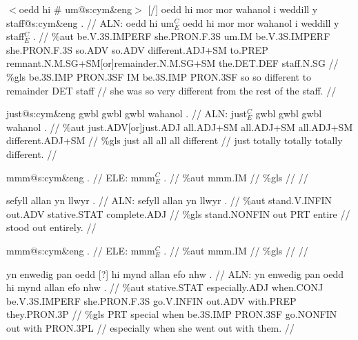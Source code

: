 \documentclass[a4paper,10pt]{article}
\begin{document}
\ex
\begingl[lingstyle=gergl]
\glchat $<$oedd hi \# um@s:cym\&eng$>$ [/] oedd hi mor mor wahanol i weddill y staff@s:cym\&eng . //
\glsurface ALN:  oedd hi um$^{C}_{E}$ oedd hi mor mor wahanol i weddill y staff$^{C}_{E}$ .  //
\glauto \%aut  be{\scriptsize .V.3S.IMPERF} she{\scriptsize .PRON.F.3S} um{\scriptsize .IM} be{\scriptsize .V.3S.IMPERF} she{\scriptsize .PRON.F.3S} so{\scriptsize .ADV} so{\scriptsize .ADV} different{\scriptsize .ADJ+SM} to{\scriptsize .PREP} remnant{\scriptsize .N.M.SG+SM[or]remainder.N.M.SG+SM} the{\scriptsize .DET.DEF} staff{\scriptsize .N.SG}   //
\glmanual \%gls  be{\scriptsize .3S.IMP} PRON{\scriptsize .3SF} IM be{\scriptsize .3S.IMP} PRON{\scriptsize .3SF} so so different to remainder DET staff   //
\gleng she was so very different from the rest of the staff. //
\endgl
\xe

\ex
\begingl[lingstyle=gergl]
\glchat just@s:cym\&eng gwbl gwbl gwbl wahanol . //
\glsurface ALN:  just$^{C}_{E}$ gwbl gwbl gwbl wahanol .  //
\glauto \%aut  just{\scriptsize .ADV[or]just.ADJ} all{\scriptsize .ADJ+SM} all{\scriptsize .ADJ+SM} all{\scriptsize .ADJ+SM} different{\scriptsize .ADJ+SM}   //
\glmanual \%gls  just all all all different   //
\gleng just totally totally totally different. //
\endgl
\xe

\ex
\begingl[lingstyle=gergl]
\glchat mmm@s:cym\&eng . //
\glsurface ELE:  mmm$^{C}_{E}$ .  //
\glauto \%aut  mmm{\scriptsize .IM}   //
\glmanual \%gls     //
\gleng  //
\endgl
\xe

\ex
\begingl[lingstyle=gergl]
\glchat sefyll allan yn llwyr . //
\glsurface ALN:  sefyll allan yn llwyr .  //
\glauto \%aut  stand{\scriptsize .V.INFIN} out{\scriptsize .ADV} stative{\scriptsize .STAT} complete{\scriptsize .ADJ}   //
\glmanual \%gls  stand{\scriptsize .NONFIN} out PRT entire   //
\gleng stood out entirely. //
\endgl
\xe

\ex
\begingl[lingstyle=gergl]
\glchat mmm@s:cym\&eng . //
\glsurface ELE:  mmm$^{C}_{E}$ .  //
\glauto \%aut  mmm{\scriptsize .IM}   //
\glmanual \%gls     //
\gleng  //
\endgl
\xe

\ex
\begingl[lingstyle=gergl]
\glchat yn enwedig pan oedd [?] hi mynd allan efo nhw . //
\glsurface ALN:  yn enwedig pan oedd hi mynd allan efo nhw .  //
\glauto \%aut  stative{\scriptsize .STAT} especially{\scriptsize .ADJ} when{\scriptsize .CONJ} be{\scriptsize .V.3S.IMPERF} she{\scriptsize .PRON.F.3S} go{\scriptsize .V.INFIN} out{\scriptsize .ADV} with{\scriptsize .PREP} they{\scriptsize .PRON.3P}   //
\glmanual \%gls  PRT special when be{\scriptsize .3S.IMP} PRON{\scriptsize .3SF} go{\scriptsize .NONFIN} out with PRON{\scriptsize .3PL}   //
\gleng especially when she went out with them. //
\endgl
\xe
\end{document}
